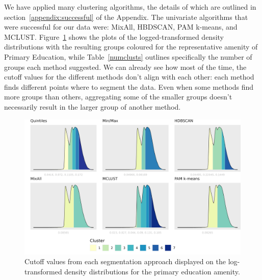 \documentclass[11pt, a4paper]{article}
\begin{document}
We have applied many clustering algorithms, the details of which are outlined in section~\ref{appendix:successful} of the Appendix. The univariate algorithms that were successful for our data were: MixAll, HBDSCAN, PAM k-means, and MCLUST. Figure~\ref{prieduccutoffs} shows the plots of the logged-transformed density distributions with the resulting groups coloured for the representative amenity of Primary Education, while Table~\ref{numclusts} outlines specifically the number of groups each method suggested. We can already see how most of the time, the cutoff values for the different methods don’t align with each other: each method finds different points where to segment the data. Even when some methods find more groups than others, aggregating some of the smaller groups doesn't necessarily result in the larger group of another method.  





\begin{figure}[H]
\centering
\includegraphics[width=\textwidth]{./cutoffs/by_amenity/Primary Education_cutoffs.png}
\caption[Primary education cutoffs]{Cutoff values from each segmentation approach displayed on the log-transformed density distributions for the primary education amenity.}\label{prieduccutoffs}
\end{figure}
\end{document}
